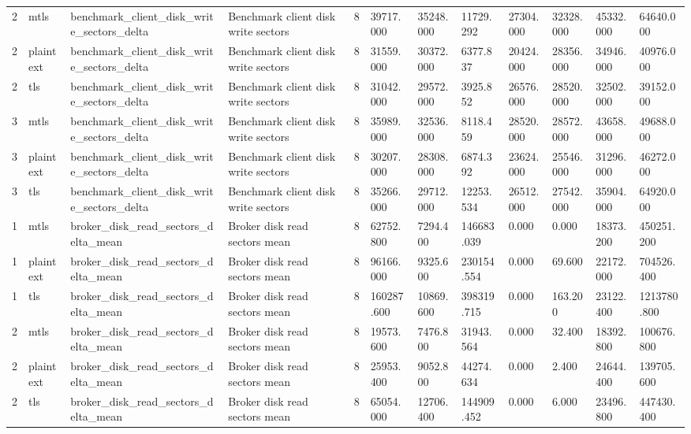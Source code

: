 \begin{longtable}{llllllllllll}
2 & mtls & benchmark\_client\_disk\_write\_sectors\_delta & Benchmark client disk write sectors & 8 & 39717.000 & 35248.000 & 11729.292 & 27304.000 & 32328.000 & 45332.000 & 64640.000 \\
2 & plaintext & benchmark\_client\_disk\_write\_sectors\_delta & Benchmark client disk write sectors & 8 & 31559.000 & 30372.000 & 6377.837 & 20424.000 & 28356.000 & 34946.000 & 40976.000 \\
2 & tls & benchmark\_client\_disk\_write\_sectors\_delta & Benchmark client disk write sectors & 8 & 31042.000 & 29572.000 & 3925.852 & 26576.000 & 28520.000 & 32502.000 & 39152.000 \\
3 & mtls & benchmark\_client\_disk\_write\_sectors\_delta & Benchmark client disk write sectors & 8 & 35989.000 & 32536.000 & 8118.459 & 28520.000 & 28572.000 & 43658.000 & 49688.000 \\
3 & plaintext & benchmark\_client\_disk\_write\_sectors\_delta & Benchmark client disk write sectors & 8 & 30207.000 & 28308.000 & 6874.392 & 23624.000 & 25546.000 & 31296.000 & 46272.000 \\
3 & tls & benchmark\_client\_disk\_write\_sectors\_delta & Benchmark client disk write sectors & 8 & 35266.000 & 29712.000 & 12253.534 & 26512.000 & 27542.000 & 35904.000 & 64920.000 \\
1 & mtls & broker\_disk\_read\_sectors\_delta\_mean & Broker disk read sectors mean & 8 & 62752.800 & 7294.400 & 146683.039 & 0.000 & 0.000 & 18373.200 & 450251.200 \\
1 & plaintext & broker\_disk\_read\_sectors\_delta\_mean & Broker disk read sectors mean & 8 & 96166.000 & 9325.600 & 230154.554 & 0.000 & 69.600 & 22172.000 & 704526.400 \\
1 & tls & broker\_disk\_read\_sectors\_delta\_mean & Broker disk read sectors mean & 8 & 160287.600 & 10869.600 & 398319.715 & 0.000 & 163.200 & 23122.400 & 1213780.800 \\
2 & mtls & broker\_disk\_read\_sectors\_delta\_mean & Broker disk read sectors mean & 8 & 19573.600 & 7476.800 & 31943.564 & 0.000 & 32.400 & 18392.800 & 100676.800 \\
2 & plaintext & broker\_disk\_read\_sectors\_delta\_mean & Broker disk read sectors mean & 8 & 25953.400 & 9052.800 & 44274.634 & 0.000 & 2.400 & 24644.400 & 139705.600 \\
2 & tls & broker\_disk\_read\_sectors\_delta\_mean & Broker disk read sectors mean & 8 & 65054.000 & 12706.400 & 144909.452 & 0.000 & 6.000 & 23496.800 & 447430.400 \\

\end{longtable}
